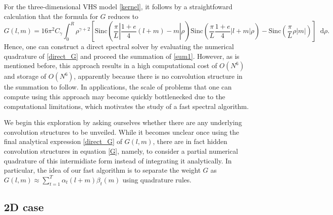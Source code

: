 \documentclass[review, times]{elsarticle}
\newcommand*\diff{\mathop{}\!\mathrm{d}}
\begin{document}
For the three-dimensional VHS model \eqref{kernel}, it follows by a straightfoward calculation that the formula for $G$ reduces to
\begin{equation} \label{direct_G}
  G(l,m)=16\pi^2C_{\gamma}\int_0^R \rho^{\gamma+2}\left[\text{Sinc}\left(\frac{\pi}{L}\left|\frac{1+e}{4}(l+m)-m\right|\rho\right)\text{Sinc}\left(\frac{\pi}{L}\frac{1+e}{4}|l+m|\rho\right)-\text{Sinc}\left(\frac{\pi}{L}\rho|m|\right)\right]\diff\rho.
\end{equation}
Hence, one can construct a direct spectral solver by evaluating the numerical quadrature of \eqref{direct_G} and proceed the summation of \eqref{sum1}. However, as is mentioned before, this approach results in a high computational cost of $O(N^6)$ and storage of $O(N^6)$, apparently because there is no convolution structure in the summation to follow. In applications, the scale of problems that one can compute using this approach may become quickly bottlenecked due to the computational limitations, which motivates the study of a fast spectral algorithm. 

We begin this exploration by asking ourselves whether there are any underlying convolution structures to be unveiled. While it becomes unclear once using the final analytical expression \eqref{direct_G} of $G(l,m)$, there are in fact hidden convolution structures in equation \eqref{G}, namely, to consider a partial numerical quadrature of this intermidiate form instead of integrating it analytically. In particular, the idea of our fast algorithm is to separate the weight $G$ as $G(l,m)\approx\sum_{t=1}^T\alpha_t(l+m)\beta_t(m)$ using quadrature rules.

\subsection{2D case}
\end{document}
